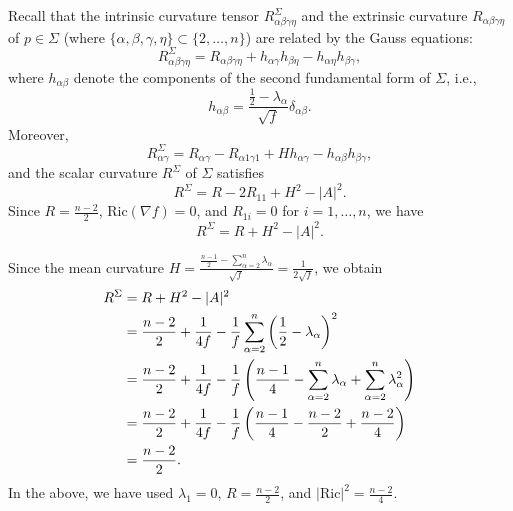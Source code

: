 \documentclass[a4, 12pt]{amsart}
\theoremstyle{plain}
\begin{document}
Recall that the intrinsic curvature tensor $R^{\Sigma}_{\alpha\beta\gamma\eta}$ and the extrinsic curvature $R_{\alpha\beta\gamma\eta}$ of $p \in \Sigma$ (where $\{\alpha,\beta,\gamma,\eta\} \subset \{2, \ldots, n\}$) are related by the Gauss equations:
\begin{equation*}\label{gauss-equation}
	R^{\Sigma}_{\alpha\beta\gamma\eta} = R_{\alpha\beta\gamma\eta} + h_{\alpha\gamma}h_{\beta\eta} - h_{\alpha\eta}h_{\beta\gamma},
\end{equation*}
where $h_{\alpha\beta}$ denote the components of the second fundamental form of $\Sigma$, i.e.,
\begin{equation*}\label{second-fundamental-form}
	h_{\alpha\beta} = \frac{\frac{1}{2} - \lambda_\alpha}{\sqrt{f}}\delta_{\alpha\beta}.
\end{equation*}
Moreover,
\begin{equation*}\label{ricci-level-set}
	R^{\Sigma}_{\alpha\gamma} = R_{\alpha\gamma} - R_{\alpha 1\gamma 1} + Hh_{\alpha\gamma} - h_{\alpha\beta}h_{\beta\gamma},
\end{equation*}
and the scalar curvature $R^{\Sigma}$ of $\Sigma$ satisfies
\begin{equation*}\label{scalar-level-set}
	R^{\Sigma} = R - 2R_{11} + H^2 - |A|^2.
\end{equation*}
Since $R = \frac{n-2}{2}$, $\mathrm{Ric}(\nabla f) = 0$, and $R_{1i} = 0$ for $i = 1, \ldots, n$, we have
\begin{equation*}\label{scalar-simplified}
	R^{\Sigma} = R + H^2 - |A|^2.
\end{equation*}

Since the mean curvature $H = \frac{\frac{n-1}{2} - \sum_{\alpha=2}^n \lambda_\alpha}{\sqrt{f}} = \frac{1}{2\sqrt{f}}$, we obtain
\begin{align*}
	R^{\Sigma} &= R + H^2 - |A|^2 \notag\\
	&= \frac{n-2}{2} + \frac{1}{4f} - \frac{1}{f}\sum_{\alpha=2}^n\left(\frac{1}{2} - \lambda_\alpha\right)^2 \notag\\
	&= \frac{n-2}{2} + \frac{1}{4f} - \frac{1}{f}\left(\frac{n-1}{4} - \sum_{\alpha=2}^n\lambda_\alpha + \sum_{\alpha=2}^n\lambda_\alpha^2\right) \notag\\
	&= \frac{n-2}{2} + \frac{1}{4f} - \frac{1}{f}\left(\frac{n-1}{4} - \frac{n-2}{2} + \frac{n-2}{4}\right) \notag\\
	&= \frac{n-2}{2}. \label{scalar-final}
\end{align*}
In the above, we have used $\lambda_1 = 0$, $R = \frac{n-2}{2}$, and $|\mathrm{Ric}|^2 = \frac{n-2}{4}$.
\end{document}
